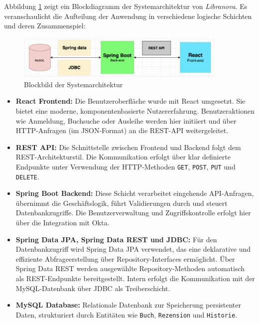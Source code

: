 \noindent Abbildung \ref{fig:blockbild} zeigt ein Blockdiagramm der Systemarchitektur von \textit{Libranova}. Es veranschaulicht die Aufteilung der Anwendung in verschiedene logische Schichten und deren Zusammenspiel:
\begin{figure}[H]  
	\centering %
	\includegraphics[width=0.9\textwidth]{Images/SpringAndReact.png} 
	\caption{Blockbild der Systemarchitektur} 
	\label{fig:blockbild} 
\end{figure}
\begin{itemize}
	\item \textbf{React Frontend:} Die Benutzeroberfläche wurde mit React umgesetzt. Sie bietet eine moderne, komponentenbasierte Nutzererfahrung. Benutzeraktionen wie Anmeldung, Buchsuche oder Ausleihe werden hier initiiert und über HTTP-Anfragen (im JSON-Format) an die REST-API weitergeleitet.
	
	\item \textbf{REST API:} Die Schnittstelle zwischen Frontend und Backend folgt dem REST-Architekturstil. Die Kommunikation erfolgt über klar definierte Endpunkte unter Verwendung der HTTP-Methoden \texttt{GET}, \texttt{POST}, \texttt{PUT} und \texttt{DELETE}.
	
	\item \textbf{Spring Boot Backend:} Diese Schicht verarbeitet eingehende API-Anfragen, übernimmt die Geschäftslogik, führt Validierungen durch und steuert Datenbankzugriffe. Die Benutzerverwaltung und Zugriffskontrolle erfolgt hier über die Integration mit Okta.
	
	\item \textbf{Spring Data JPA, Spring Data REST und JDBC:} Für den Datenbankzugriff wird Spring Data JPA verwendet, das eine deklarative und effiziente Abfrageerstellung über Repository-Interfaces ermöglicht. Über Spring Data REST werden ausgewählte Repository-Methoden automatisch als REST-Endpunkte bereitgestellt. Intern erfolgt die Kommunikation mit der MySQL-Datenbank über JDBC als Treiberschicht.
	
	\item \textbf{MySQL Database:} Relationale Datenbank zur Speicherung persistenter Daten, strukturiert durch Entitäten wie \texttt{Buch}, \texttt{Rezension} und \texttt{Historie}.
\end{itemize}

